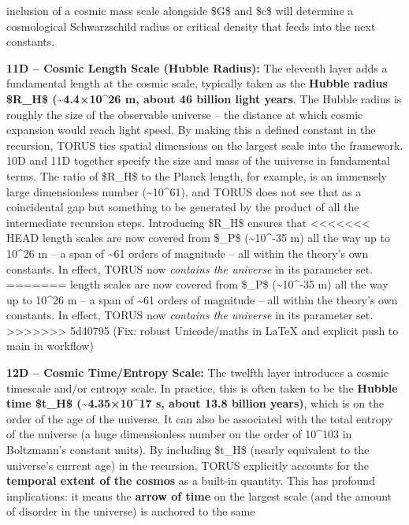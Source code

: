 \documentclass[]{article}
\begin{document}
\begin{itemize}
{  inclusion of a cosmic mass scale alongside \$G\$ and \$c\$ will
  determine a cosmological Schwarzschild radius or critical density that
  feeds into the next constants.
\item
  \textbf{11D -- Cosmic Length Scale (Hubble Radius):} The eleventh
  layer adds a fundamental length at the cosmic scale, typically taken
  as the \textbf{Hubble radius \$R\_H\$ (\textasciitilde{}4.4×10\^{}26
  m, about 46 billion light years}. The Hubble radius is roughly the
  size of the observable universe -- the distance at which cosmic
  expansion would reach light speed. By making this a defined constant
  in the recursion, TORUS ties spatial dimensions on the largest scale
  into the framework. 10D and 11D together specify the size and mass of
  the universe in fundamental terms. The ratio of \$R\_H\$ to the Planck
  length, for example, is an immensely large dimensionless number
  (\textasciitilde{}10\^{}61), and TORUS does not see that as a
  coincidental gap but something to be generated by the product of all
  the intermediate recursion steps. Introducing \$R\_H\$ ensures that
<<<<<<< HEAD
  length scales are now covered from \$\ell\_P\$ (\textasciitilde10\^{}-35
  m) all the way up to 10\^{}26 m -- a span of \textasciitilde61 orders
  of magnitude -- all within the theory's own constants. In effect,
  TORUS now \emph{contains the universe} in its parameter set.
=======
  length scales are now covered from \$\ell\_P\$
  (\textasciitilde{}10\^{}-35 m) all the way up to 10\^{}26 m -- a span
  of \textasciitilde{}61 orders of magnitude -- all within the theory's
  own constants. In effect, TORUS now \emph{contains the universe} in
  its parameter set.
>>>>>>> 5d40795 (Fix: robust Unicode/maths in LaTeX and explicit push to main in workflow)
\item
  \textbf{12D -- Cosmic Time/Entropy Scale:} The twelfth layer
  introduces a cosmic timescale and/or entropy scale. In practice, this
  is often taken to be the \textbf{Hubble time \$t\_H\$
  (\textasciitilde{}4.35×10\^{}17 s, about 13.8 billion years)}, which
  is on the order of the age of the universe​. It can also be associated
  with the total entropy of the universe (a huge dimensionless number on
  the order of 10\^{}103 in Boltzmann's constant units). By including
  \$t\_H\$ (nearly equivalent to the universe's current age) in the
  recursion, TORUS explicitly accounts for the \textbf{temporal extent
  of the cosmos} as a built-in quantity. This has profound implications:
  it means the \textbf{arrow of time} on the largest scale (and the
  amount of disorder in the universe) is anchored to the same
}
\end{itemize}
\end{document}
